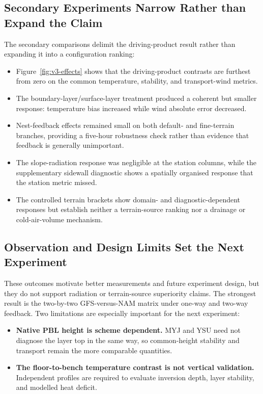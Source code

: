 \documentclass[air,article,submit,moreauthors]{Definitions/mdpi}
\begin{document}
\subsection{Secondary Experiments Narrow Rather than Expand the Claim}
\label{sec:v3-disc-process}

The secondary comparisons delimit the driving-product result rather than expanding it into a configuration ranking:

\begin{itemize}
  \item Figure~\ref{fig:v3-effects} shows that the driving-product contrasts are furthest from zero on the common temperature, stability, and transport-wind metrics.
  \item The boundary-layer/surface-layer treatment produced a coherent but smaller response: temperature bias increased while wind absolute error decreased.
  \item Nest-feedback effects remained small on both default- and fine-terrain branches, providing a five-hour robustness check rather than evidence that feedback is generally unimportant.
  \item The slope-radiation response was negligible at the station columns, while the supplementary sidewall diagnostic shows a spatially organised response that the station metric missed.
  \item The controlled terrain brackets show domain- and diagnostic-dependent responses but establish neither a terrain-source ranking nor a drainage or cold-air-volume mechanism.
\end{itemize}

\subsection{Observation and Design Limits Set the Next Experiment}
\label{sec:v3-disc-domains}

These outcomes motivate better measurements and future experiment design, but they do not support radiation or terrain-source superiority claims.
The strongest result is the two-by-two GFS-versus-NAM matrix under one-way and two-way feedback.
Two limitations are especially important for the next experiment:
\begin{itemize}
  \item \textbf{Native PBL height is scheme dependent.} MYJ and YSU need not diagnose the layer top in the same way, so common-height stability and transport remain the more comparable quantities.
  \item \textbf{The floor-to-bench temperature contrast is not vertical validation.} Independent profiles are required to evaluate inversion depth, layer stability, and modelled heat deficit.
\end{itemize}
\end{document}
